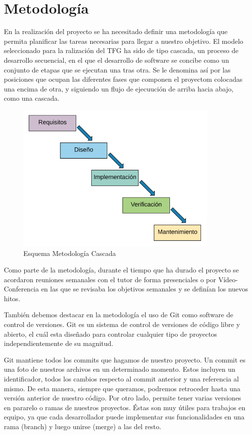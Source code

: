 \section{Metodología}
En la realización del proyecto se ha necesitado definir una metodología que permita planificar las tareas necesarias para llegar a nuestro objetivo. El modelo seleccionado para la ralización del TFG ha sido de tipo cascada, un proceso de desarrollo secuencial, en el que el desarrollo de software se concibe como un conjunto de etapas que se ejecutan una tras otra. Se le denomina así por las posiciones que ocupan las diferentes fases que componen el proyectom colocadas una encima de otra, y siguiendo un flujo de ejecuución de arriba hacia abajo, como una cascada.


\begin{figure}[!h]
    \centering
    \includegraphics[width=100mm]{img/objetivos/cascada.png}
    \caption{Esquema Metodología Cascada}
\end{figure}

Como parte de la metodología, durante el tiempo que ha durado el proyecto se acordaron reuniones semanales con el tutor de forma presenciales o por Vídeo-Conferencia en las que se revisaba los objetivos semanales y se definían los nuevos hitos.

También debemos destacar en la metodología el uso de Git como software de control de versiones. Git es un sistema de control de versiones de código libre y abierto, el cuál esta diseñado para controlar cualquier tipo de proyectos independientemente de su magnitud.

Git mantiene todos los commits que hagamos de nuestro proyecto. Un commit es una foto de nuestros archivos en un determinado momento. Estos incluyen un identificador, todos los cambios respecto al commit anterior y una referencia al mismo. De esta manera, siempre que queramos, podremos retroceder hasta una versión anterior de nuestro código.
Por otro lado, permite tener varias versiones en pararelo o ramas de nuestros proyectos. Éstas son muy útiles para trabajos en equipo, ya que cada desarrollador puede implementar sus funcionalidades en una rama (branch) y luego unirse (merge) a las del resto.

